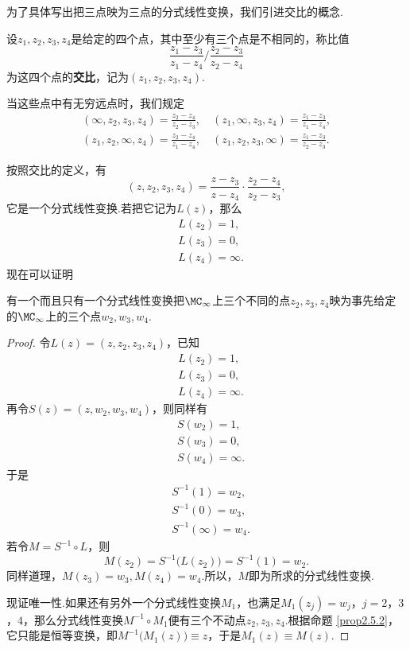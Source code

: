 为了具体写出把三点映为三点的分式线性变换，我们引进交比的概念.
\begin{definition}\label{def2.5.3}
设$z_1,z_2,z_3,z_4$是给定的四个点，其中至少有三个点是不相同的，称比值
\[\frac{z_1-z_3}{z_1-z_4}\bigg/\frac{z_2-z_3}{z_2-z_4}\]
为这四个点的\textbf{交比}，记为$(z_1,z_2,z_3,z_4)$.
\end{definition}
当这些点中有无穷远点时，我们规定
\begin{gather*}
(\infty,z_2,z_3,z_4)=\frac{z_2-z_4}{z_2-z_3},\quad
(z_1,\infty,z_3,z_4)=\frac{z_1-z_3}{z_1-z_4},\\
(z_1,z_2,\infty,z_4)=\frac{z_2-z_4}{z_1-z_4},\quad
(z_1,z_2,z_3,\infty)=\frac{z_1-z_3}{z_2-z_3}.
\end{gather*}

按照交比的定义，有
\[(z,z_2,z_3,z_4)=\frac{z-z_3}{z-z_4}\cdot\frac{z_2-z_4}{z_2-z_3},\]
它是一个分式线性变换.若把它记为$L(z)$，那么
\begin{align*}
  &L(z_2)=1,\\
  &L(z_3)=0,\\
  &L(z_4)=\infty.
\end{align*}
现在可以证明
\begin{theorem}\label{thm2.5.4}
  有一个而且只有一个分式线性变换把$\MC_\infty$上三个不同的点$z_2,z_3,z_4$映为事先给定的$\MC_\infty$上的三个点$w_2,w_3,w_4$.
\end{theorem}
\begin{proof}
  令$L(z)=(z,z_2,z_3,z_4)$，已知
  \begin{equation}\label{eq2.5.2}
    \begin{aligned}
    &L(z_2)=1,\\
    &L(z_3)=0,\\
    &L(z_4)=\infty.
    \end{aligned}
  \end{equation}
再令$S(z)=(z,w_2,w_3,w_4)$，则同样有
\begin{equation*}
    \begin{aligned}
    &S(w_2)=1,\\
    &S(w_3)=0,\\
    &S(w_4)=\infty.
    \end{aligned}
  \end{equation*}
于是
\begin{equation*}
  \begin{aligned}
    &S^{-1}(1)=w_2,\\
    &S^{-1}(0)=w_3,\\
    &S^{-1}(\infty)=w_4.
  \end{aligned}
\end{equation*}
若令$M=S^{-1}\circ L$，则
\[M(z_2)=S^{-1}\big(L(z_2)\big)=S^{-1}(1)=w_2.\]
同样道理，$M(z_3)=w_3,M(z_4)=w_4$.所以，$M$即为所求的分式线性变换.

现证唯一性.如果还有另外一个分式线性变换$M_1$，也满足$M_1(z_j)=w_j$，$j=2$，$3$，$4$，那么分式线性变换$M^{-1}\circ M_1$便有三个不动点$z_2,z_3,z_4$.根据命题  \ref{prop2.5.2}，它只能是恒等变换，即$M^{-1}\big(M_1(z)\big)\equiv z$，于是$M_1(z)\equiv M(z)$.
\end{proof}

